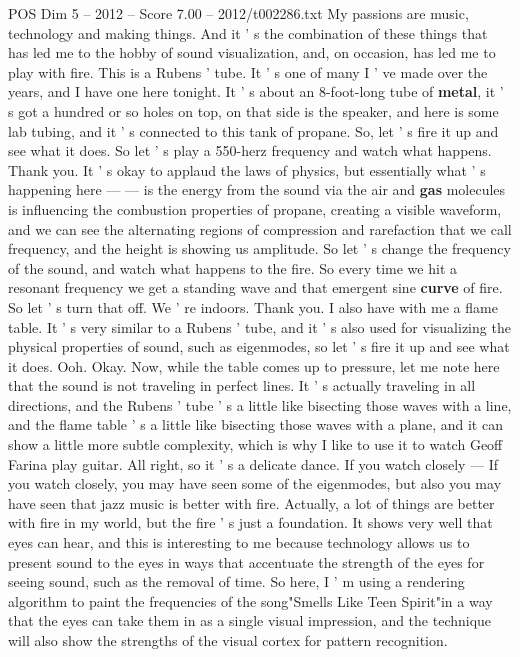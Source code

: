 \begin{textsample}{POS Dim 5 – 2012 – Score 7.00 – 2012/t002286.txt}  \label{ex:f5_pos_038}
My passions are music, technology and making things.
And it ' s the combination of these things that has led me to the hobby of sound visualization, and, on occasion, has led me to play with fire.
This is a Rubens ' tube.
It ' s one of many I ' ve made over the years, and I have one here tonight.
It ' s about an 8-foot-long tube of \textbf{metal}, it ' s got a hundred or so holes on top, on that side is the speaker, and here is some lab tubing, and it ' s connected to this tank of propane.
So, let ' s fire it up and see what it does.
So let ' s play a 550-herz frequency and watch what happens.
Thank you.
It ' s okay to applaud the laws of physics, but essentially what ' s happening here — — is the energy from the sound via the air and \textbf{gas} molecules is influencing the combustion properties of propane, creating a visible waveform, and we can see the alternating regions of compression and rarefaction that we call frequency, and the height is showing us amplitude.
So let ' s change the frequency of the sound, and watch what happens to the fire.
So every time we hit a resonant frequency we get a standing wave and that emergent sine \textbf{curve} of fire.
So let ' s turn that off.
We ' re indoors.
Thank you.
I also have with me a flame table.
It ' s very similar to a Rubens ' tube, and it ' s also used for visualizing the physical properties of sound, such as eigenmodes, so let ' s fire it up and see what it does.
Ooh.
Okay.
Now, while the table comes up to pressure, let me note here that the sound is not traveling in perfect lines.
It ' s actually traveling in all directions, and the Rubens ' tube ' s a little like bisecting those waves with a line, and the flame table ' s a little like bisecting those waves with a plane, and it can show a little more subtle complexity, which is why I like to use it to watch Geoff Farina play guitar.
All right, so it ' s a delicate dance.
If you watch closely — If you watch closely, you may have seen some of the eigenmodes, but also you may have seen that jazz music is better with fire.
Actually, a lot of things are better with fire in my world, but the fire ' s just a foundation.
It shows very well that eyes can hear, and this is interesting to me because technology allows us to present sound to the eyes in ways that accentuate the strength of the eyes for seeing sound, such as the removal of time.
So here, I ' m using a rendering algorithm to paint the frequencies of the song"Smells Like Teen Spirit"in a way that the eyes can take them in as a single visual impression, and the technique will also show the strengths of the visual cortex for pattern recognition.

\end{textsample}

